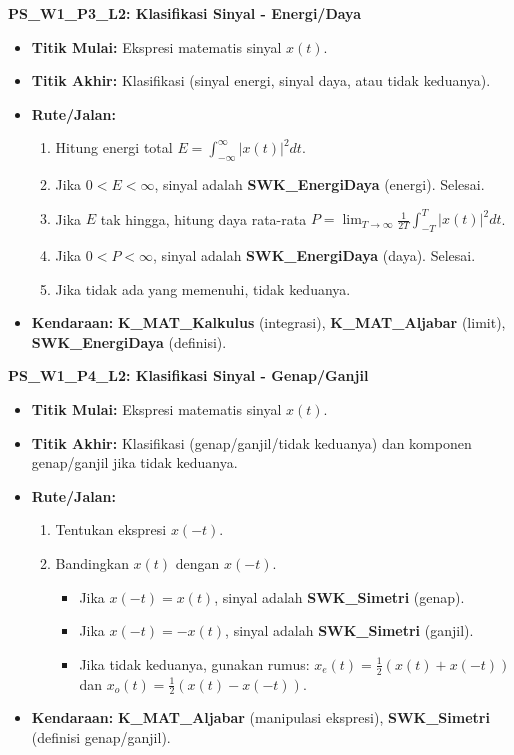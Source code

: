 \documentclass[
  letterpaper,
  DIV=11,
  numbers=noendperiod]{scrreprt}
\providecommand{\tightlist}{%
  \setlength{\itemsep}{0pt}\setlength{\parskip}{0pt}}
\begin{document}
\textbf{PS\_W1\_P3\_L2: Klasifikasi Sinyal - Energi/Daya}

\begin{itemize}
\tightlist
\item
  \textbf{Titik Mulai:} Ekspresi matematis sinyal \(x(t)\).
\item
  \textbf{Titik Akhir:} Klasifikasi (sinyal energi, sinyal daya, atau
  tidak keduanya).
\item
  \textbf{Rute/Jalan:}

  \begin{enumerate}
  \def\labelenumi{\arabic{enumi}.}
  \tightlist
  \item
    Hitung energi total \(E = \int_{-\infty}^{\infty} |x(t)|^2 dt\).
  \item
    Jika \(0 < E < \infty\), sinyal adalah \textbf{SWK\_EnergiDaya}
    (energi). Selesai.
  \item
    Jika \(E\) tak hingga, hitung daya rata-rata
    \(P = \lim_{T \to \infty} \frac{1}{2T} \int_{-T}^{T} |x(t)|^2 dt\).
  \item
    Jika \(0 < P < \infty\), sinyal adalah \textbf{SWK\_EnergiDaya}
    (daya). Selesai.
  \item
    Jika tidak ada yang memenuhi, tidak keduanya.
  \end{enumerate}
\item
  \textbf{Kendaraan:} \textbf{K\_MAT\_Kalkulus} (integrasi),
  \textbf{K\_MAT\_Aljabar} (limit), \textbf{SWK\_EnergiDaya} (definisi).
\end{itemize}

\textbf{PS\_W1\_P4\_L2: Klasifikasi Sinyal - Genap/Ganjil}

\begin{itemize}
\tightlist
\item
  \textbf{Titik Mulai:} Ekspresi matematis sinyal \(x(t)\).
\item
  \textbf{Titik Akhir:} Klasifikasi (genap/ganjil/tidak keduanya) dan
  komponen genap/ganjil jika tidak keduanya.
\item
  \textbf{Rute/Jalan:}

  \begin{enumerate}
  \def\labelenumi{\arabic{enumi}.}
  \tightlist
  \item
    Tentukan ekspresi \(x(-t)\).
  \item
    Bandingkan \(x(t)\) dengan \(x(-t)\).

    \begin{itemize}
    \tightlist
    \item
      Jika \(x(-t) = x(t)\), sinyal adalah \textbf{SWK\_Simetri}
      (genap).
    \item
      Jika \(x(-t) = -x(t)\), sinyal adalah \textbf{SWK\_Simetri}
      (ganjil).
    \item
      Jika tidak keduanya, gunakan rumus:
      \(x_e(t) = \frac{1}{2}(x(t) + x(-t))\) dan
      \(x_o(t) = \frac{1}{2}(x(t) - x(-t))\).
    \end{itemize}
  \end{enumerate}
\item
  \textbf{Kendaraan:} \textbf{K\_MAT\_Aljabar} (manipulasi ekspresi),
  \textbf{SWK\_Simetri} (definisi genap/ganjil).
\end{itemize}
\end{document}
